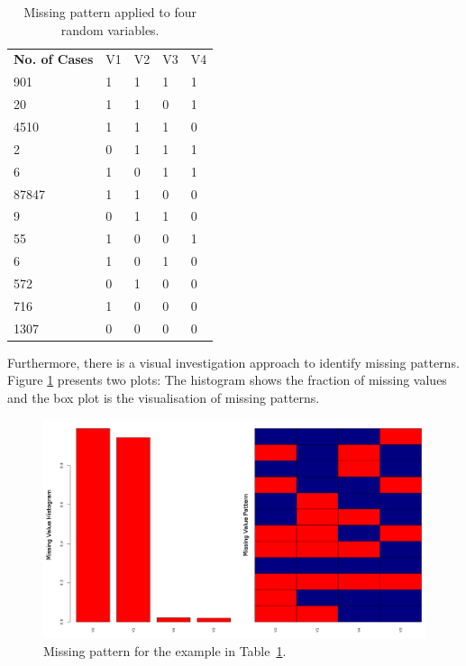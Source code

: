 \begin{table}[h!]
\centering
\caption{Missing pattern applied to four random variables.}
\label{tab:variable-pattern-example}
\begin{tabular}{lllll}
\textbf{No. of Cases} & V1 & V2 & V3 & V4 \\
901             & 1           & 1           & 1           & 1           \\
20              & 1           & 1           & 0           & 1           \\
4510            & 1           & 1           & 1           & 0           \\
2               & 0           & 1           & 1           & 1           \\
6               & 1           & 0           & 1           & 1           \\
87847           & 1           & 1           & 0           & 0           \\
9               & 0           & 1           & 1           & 0           \\
55              & 1           & 0           & 0           & 1           \\
6               & 1           & 0           & 1           & 0           \\
572             & 0           & 1           & 0           & 0           \\
716             & 1           & 0           & 0           & 0           \\
1307            & 0           & 0           & 0           & 0          
\end{tabular}
\end{table}

Furthermore, there is a visual investigation approach to identify missing patterns. Figure \ref{fig:missing-plot} presents two plots: The histogram shows the fraction of missing values and the box plot is the visualisation of missing patterns.

\begin{figure}[h!]
    \centering
    \includegraphics[scale=0.3]{Graphics/missing-pattern-plot.png}
    \caption{Missing pattern for the example in Table~\ref{tab:variable-pattern-example}.}
    \label{fig:missing-plot}
\end{figure}

